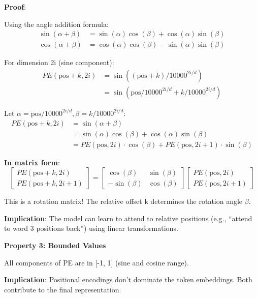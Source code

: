 \textbf{Proof}:

Using the angle addition formula:
\begin{align*}
\sin(\alpha + \beta) &= \sin(\alpha)\cos(\beta) + \cos(\alpha)\sin(\beta) \\
\cos(\alpha + \beta) &= \cos(\alpha)\cos(\beta) - \sin(\alpha)\sin(\beta)
\end{align*}

For dimension 2i (sine component):
\begin{align*}
PE(\text{pos}+k, 2i) &= \sin((\text{pos}+k) / 10000^{2i/d}) \\
               &= \sin(\text{pos}/10000^{2i/d} + k/10000^{2i/d})
\end{align*}

Let $\alpha = \text{pos}/10000^{2i/d}, \beta = k/10000^{2i/d}$:
\begin{align*}
PE(\text{pos}+k, 2i) &= \sin(\alpha + \beta) \\
               &= \sin(\alpha)\cos(\beta) + \cos(\alpha)\sin(\beta) \\
               &= PE(\text{pos},2i) \cdot \cos(\beta) + PE(\text{pos},2i+1) \cdot \sin(\beta)
\end{align*}

\textbf{In matrix form}:
\[
\begin{bmatrix}
PE(\text{pos}+k, 2i) \\
PE(\text{pos}+k, 2i+1)
\end{bmatrix}
=
\begin{bmatrix}
\cos(\beta) & \sin(\beta) \\
-\sin(\beta) & \cos(\beta)
\end{bmatrix}
\begin{bmatrix}
PE(\text{pos}, 2i) \\
PE(\text{pos}, 2i+1)
\end{bmatrix}
\]

This is a rotation matrix! The relative offset k determines the rotation angle $\beta$.

\textbf{Implication}: The model can learn to attend to relative positions (e.g., ``attend to word 3 positions back'') using linear transformations.

\textbf{Property 3: Bounded Values}

All components of PE are in [-1, 1] (sine and cosine range).

\textbf{Implication}: Positional encodings don't dominate the token embeddings. Both contribute to the final representation.

